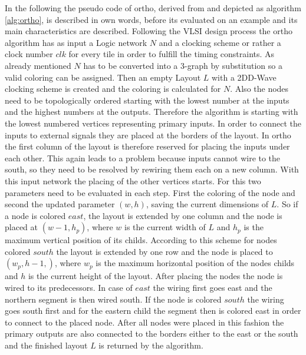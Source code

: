 In the following the pseudo code of ortho, derived from \cite{ortho} and depicted as algorithm \ref{alg:ortho}, is described in own words, before its evaluated on an example and its main characteristics are described. Following the VLSI design process the ortho algorithm has as input a Logic network $N$ and a clocking scheme or rather a clock number $clk$ for every tile in order to fulfill the timing constraints. As already mentioned $N$ has to be converted into a 3-graph by substitution so a valid coloring can be assigned. Then an empty Layout $L$ with a 2DD-Wave clocking scheme is created and the coloring is calculated for $N$. Also the nodes need to be topologically ordered starting with the lowest number at the inputs and the highest numbers at the outputs. Therefore the algorithm is starting with the lowest numbered vertices representing primary inputs. In order to connect the inputs to external signals they are placed at the borders of the layout. In ortho the first column of the layout is therefore reserved for placing the inputs under each other. This again leads to a problem because inputs cannot wire to the south, so they need to be resolved by rewiring them each on a new column. With this input network the placing of the other vertices starts. For this two parameters need to be evaluated in each step. First the coloring of the node and second the updated parameter $(w, h)$, saving the current dimensions of $L$. So if a node is colored $east$, the layout is extended by one column and the node is placed at $(w-1, h_p)$, where $w$ is the current width of $L$ and $h_p$ is the maximum vertical position of its childs. According to this scheme for nodes colored $south$ the layout is extended by one row and the node is placed to $(w_p, h-1,)$, where $w_p$ is the maximum horizontal position of the nodes childs and $h$ is the current height of the layout. After placing the nodes the node is wired to its predecessors. In case of $east$ the wiring first goes east and the northern segment is then wired south. If the node is colored $south$ the wiring goes south first and for the eastern child the segment then is colored east in order to connect to the placed node. After all nodes were placed in this fashion the primary outputs are also connected to the borders either to the east or the south and the finished layout $L$ is returned by the algorithm.\\




